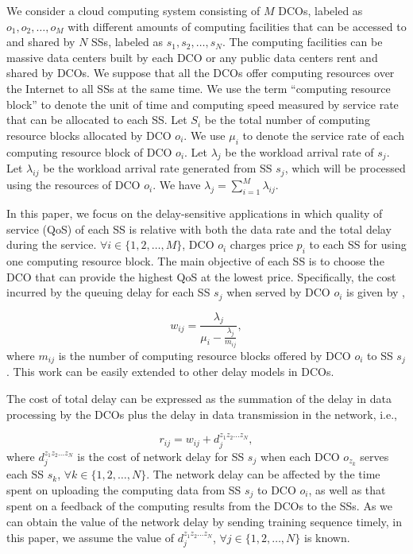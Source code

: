 \documentclass[twocolumn,10pt]{IEEEtran}
\begin{document}
We consider a cloud computing system consisting of $M$ DCOs, labeled as $o_1, o_2, \ldots, o_M$ with different amounts of computing facilities that can be accessed to and shared by $N$ SSs, labeled as $s_1, s_2, \ldots, s_N$. The computing facilities can be massive data centers built by each DCO or any public data centers rent and shared by DCOs. We suppose that all the DCOs offer computing resources over the Internet \cite{ECaron01} to all SSs at the same time. We use the term ``computing resource block'' to denote the unit of time and computing speed measured by service rate that can be allocated to each SS. Let $S_i$ be the total number of computing resource blocks allocated by DCO $o_i$. We use $\mu_i$ to denote the service rate of each computing resource block of DCO $o_i$. Let $\lambda_{j}$ be the workload arrival rate of $s_j$. Let ${\lambda _{ij}}$ be the workload arrival rate generated from SS $s_j$, which will be processed using the resources of DCO $o_i$. We have $\lambda_{j}=\sum\nolimits_{i=1}^M {{\lambda _{ij}}}$.





In this paper, we focus on the delay-sensitive applications in which quality of service (QoS) of each SS is relative with both the data rate and the total delay during the service. $\forall i \in \{1,2,\ldots,M\}$, DCO $o_i$ charges price $p_{i}$ to each SS for using one computing resource block. The main objective of each SS is to choose the DCO that can provide the highest QoS at the lowest price. Specifically, the cost incurred by the queuing delay for each SS $s_j$ when served by DCO $o_i$ is given by \cite{AGan01, ZLiu01},

\begin{equation}
      {w_{ij}} = \frac{{{\lambda _{j}}}}{{{\mu _i} - \frac{{{\lambda _{j}}}}{{{m_{ij}}}}}},
\end{equation}
where $m_{ij}$ is the number of computing resource blocks offered by DCO $o_i$ to SS $s_j$. This work can be easily extended to other delay models in DCOs.

The cost of total delay can be expressed as the summation of the delay in data processing by the DCOs plus the delay in data transmission in the network, i.e.,

\begin{equation}
      {r_{ij}} = {w_{ij}}+ d^{z_1z_2 \ldots z_N}_j,
\end{equation}
where $d^{z_1z_2 \ldots z_N}_j$ is the cost of network delay for SS $s_j$ when each DCO $o_{z_k}$ serves each SS $s_k$, $\forall k \in \{1,2,\ldots ,N\}$. The network delay can be affected by the time spent on uploading the computing data from SS $s_j$ to DCO $o_i$, as well as that spent on a feedback of the computing results from the DCOs to the SSs. As we can obtain the value of the network delay by sending training sequence timely, in this paper, we assume the value of $d^{z_1z_2 \ldots z_N}_j$, $\forall j \in \{1,2,\ldots,N\}$ is known.
\end{document}
